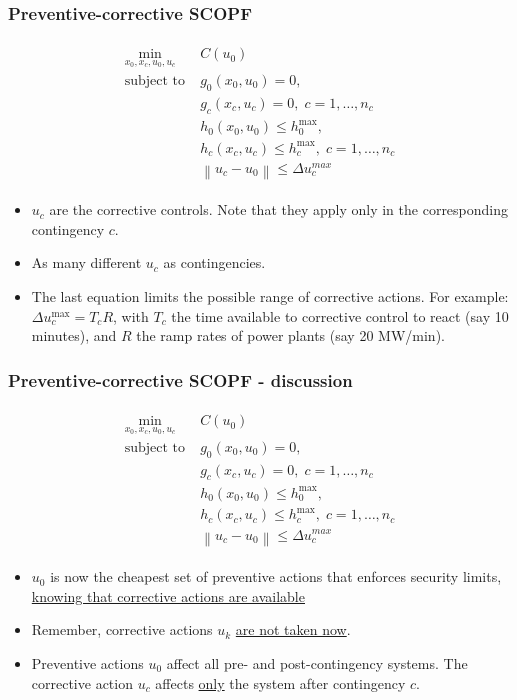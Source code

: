 \documentclass[compress]{beamer}
\newcommand\norm[1]{\left\lVert#1\right\rVert}
\begin{document}
\begin{frame}
  \frametitle{Preventive-corrective SCOPF}
  \begin{align}
  \tag{PC-SCOPF}
    \begin{split}
    \min_{x_0,x_c,u_0,u_c} \; & C(u_0) \\
    \text{subject to} \; & g_0(x_0,u_0) = 0, \; \\
    & g_c(x_c,u_c) = 0, \; c = 1,\ldots,n_c \\
    & h_0(x_0,u_0) \leq h_0^{\text{max}}, \\
    & h_c(x_c,u_c) \leq h_c^{\text{max}}, \; c = 1,\ldots,n_c \\
    & \norm{u_c - u_0} \leq \Delta u_c^{max}
    \end{split}
  \end{align}
  \begin{itemize}
  \item $u_c$ are the corrective controls. Note that they apply only in the corresponding contingency $c$.
  \item As many different $u_c$ as contingencies.
  \item The last equation limits the possible range of corrective actions. For example: $\Delta u_c^\text{max} = T_c R$, with $T_c$ the time available to corrective control to react (say 10 minutes), and $R$ the ramp rates of power plants (say 20 MW/min).
  \end{itemize}
\end{frame}

\begin{frame}
  \frametitle{Preventive-corrective SCOPF - discussion}
  \begin{align}
  \tag{PC-SCOPF}
    \begin{split}
    \min_{x_0,x_c,u_0,u_c} \; & C(u_0) \\
    \text{subject to} \; & g_0(x_0,u_0) = 0, \; \\
    & g_c(x_c,u_c) = 0, \; c = 1,\ldots,n_c \\
    & h_0(x_0,u_0) \leq h_0^{\text{max}}, \\
    & h_c(x_c,u_c) \leq h_c^{\text{max}}, \; c = 1,\ldots,n_c \\
    & \norm{u_c - u_0} \leq \Delta u_c^{max}
    \end{split}
  \end{align}
  \begin{itemize}
  \item $u_0$ is now the cheapest set of preventive actions that enforces security limits, \underline{knowing that corrective actions are available}
  \item Remember, corrective actions $u_k$ \underline{are not taken now}.
  \item Preventive actions $u_0$ affect all pre- and post-contingency systems. The corrective action $u_c$ affects \underline{only} the system after contingency $c$.
  \end{itemize}
\end{frame}
\end{document}
